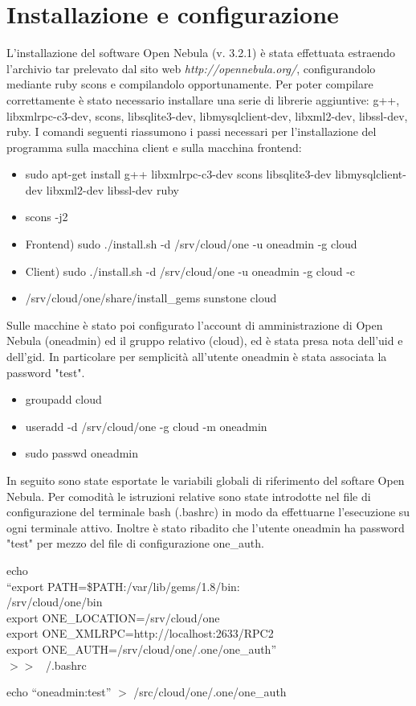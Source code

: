 \documentclass[	
	DIV=calc,
	paper=a4,
	fontsize=11pt,
	onecolumn
]{scrartcl} %
\begin{document}
\section*{Installazione e configurazione}
L'installazione del software Open Nebula (v. 3.2.1) è stata effettuata estraendo l'archivio tar prelevato dal sito web \textit{http://opennebula.org/}, configurandolo mediante ruby scons e compilandolo opportunamente. Per poter compilare correttamente è stato necessario installare una serie di librerie aggiuntive: g++, libxmlrpc-c3-dev, scons, libsqlite3-dev, libmysqlclient-dev, libxml2-dev, libssl-dev, ruby. I comandi seguenti riassumono i passi necessari per l'installazione del programma sulla macchina client e sulla macchina frontend:

\begin{itemize}
	\item sudo apt-get install g++ libxmlrpc-c3-dev scons libsqlite3-dev libmysqlclient-dev libxml2-dev libssl-dev ruby
	\item scons -j2
	\item Frontend) sudo ./install.sh -d /srv/cloud/one -u oneadmin -g cloud
	\item Client) sudo ./install.sh -d /srv/cloud/one -u oneadmin -g cloud -c
	\item /srv/cloud/one/share/install\_gems sunstone cloud
\end{itemize}

Sulle macchine è stato poi configurato l'account di amministrazione di Open Nebula (oneadmin) ed il gruppo relativo (cloud), ed è stata presa nota dell'uid e dell'gid. In particolare per semplicità all'utente oneadmin è stata associata la password "test".

\begin{itemize}
	\item groupadd cloud
	\item useradd -d /srv/cloud/one -g cloud -m oneadmin
	\item sudo passwd oneadmin
\end{itemize}

In seguito sono state esportate le variabili globali di riferimento del softare Open Nebula. Per comodità le istruzioni relative sono state introdotte nel file di configurazione del terminale bash (.bashrc) in modo da effettuarne l'esecuzione su ogni terminale attivo. Inoltre è stato ribadito che l'utente oneadmin ha password "test" per mezzo del file di configurazione one\_auth.

\begin{itemize}
	\item
	\footnotesize{ 
	echo\\``export PATH=\$PATH:/var/lib/gems/1.8/bin:\\/srv/cloud/one/bin
	\\export ONE\_LOCATION=/srv/cloud/one
	\\export ONE\_XMLRPC=http://localhost:2633/RPC2
	\\export ONE\_AUTH=/srv/cloud/one/.one/one\_auth''\\ $>>$ ~/.bashrc
	\item echo ``oneadmin:test'' $>$ /src/cloud/one/.one/one\_auth
	}
\end{itemize}
\end{document}
